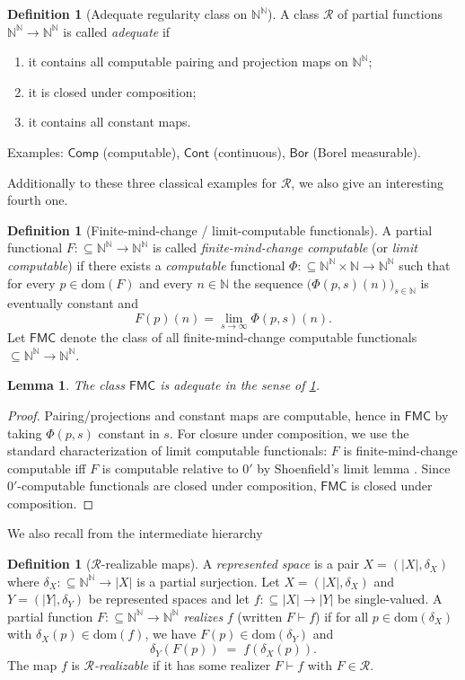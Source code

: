 \documentclass{lmcs} %
\theoremstyle{plain}
\theoremstyle{plain}
\newtheorem{lemma}[theorem]{Lemma}
\theoremstyle{definition}
\newtheorem{definition}[theorem]{Definition}
\theoremstyle{remark}
\theoremstyle{definition}
\theoremstyle{remark}
\numberwithin{equation}{section}
\newcommand{\N}{\mathbb{N}}
\newcommand{\NN}{\mathbb{N}}
\newcommand{\Baire}{\N^\N}
\newcommand{\dom}{\mathrm{dom}}
\newcommand{\Bor}{\mathsf{Bor}}
\newcommand{\Cont}{\mathsf{Cont}}
\newcommand{\Comp}{\mathsf{Comp}}
\begin{document}
\begin{definition}[Adequate regularity class on $\Baire$]\label{def:adequate-R}
A class $\mathcal R$ of partial functions $\Baire\to\Baire$ is called \textit{adequate} if
\begin{enumerate}
\item it contains all computable pairing and projection maps on $\Baire$;
\item it is closed under composition;
\item it contains all constant maps.
\end{enumerate}
Examples: $\Comp$ (computable), $\Cont$ (continuous), $\Bor$ (Borel measurable).
\end{definition}

Additionally to these three classical examples for $\mathcal R$, we also give an interesting fourth one.
\begin{definition}[Finite-mind-change / limit-computable functionals]\label{def:FMC}
A partial functional $F:\subseteq\NN^\NN\to\NN^\NN$ is called \textit{finite-mind-change computable}
(or \textit{limit computable}) if there exists a \textit{computable} functional
$\Phi:\subseteq\NN^\NN\times\NN\to\NN^\NN$ such that for every $p\in\dom(F)$ and every $n\in\NN$
the sequence $\bigl(\Phi(p,s)(n)\bigr)_{s\in\NN}$ is eventually constant and
\[
F(p)(n)=\lim_{s\to\infty}\Phi(p,s)(n).
\]
Let $\mathsf{FMC}$ denote the class of all finite-mind-change computable functionals
$\subseteq\NN^\NN\to\NN^\NN$.
\end{definition}

\begin{lemma}\label{lem:FMC-adequate}
The class $\mathsf{FMC}$ is adequate in the sense of \cref{def:adequate-R}.
\end{lemma}
\begin{proof}
Pairing/projections and constant maps are computable, hence in $\mathsf{FMC}$ by taking
$\Phi(p,s)$ constant in $s$.
For closure under composition, we use the standard characterization of limit computable
functionals: $F$ is finite-mind-change computable iff $F$ is computable relative to $0'$ by Shoenfield's limit lemma \cite{Sho59}. Since $0'$-computable functionals are closed under composition, $\mathsf{FMC}$ is closed under composition.
\end{proof}

We also recall from the intermediate hierarchy
\begin{definition}[$\mathcal R$-realizable maps]\label{def:R-realizable}
A \textit{represented space} is a pair $X=(|X|,\delta_X)$ where
$\delta_X:\subseteq \Baire\to |X|$ is a partial surjection.
Let $X=(|X|,\delta_X)$ and $Y=(|Y|,\delta_Y)$ be represented spaces and let
$f:\subseteq |X|\to |Y|$ be single-valued.
A partial function $F:\subseteq\Baire\to\Baire$ \textit{realizes} $f$
(written $F \vdash f$) if for all $p\in\dom(\delta_X)$ with $\delta_X(p)\in\dom(f)$,
we have $F(p)\in\dom(\delta_Y)$ and
\[
\delta_Y(F(p)) \;=\; f(\delta_X(p)).
\]
The map $f$ is \textit{$\mathcal R$-realizable} if it has some realizer $F\vdash f$
with $F\in \mathcal R$.
\end{definition}
\end{document}

